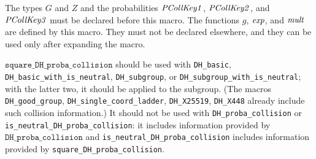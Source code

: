 \documentclass{article}
\begin{document}
\begin{itemize}
\begin{itemize}
\begin{itemize}
       The types $G$ and $Z$ and the probabilities $\mathit{PCollKey1}$, $\mathit{PCollKey2}$, 
       and $\mathit{PCollKey3}$ must be declared before this macro.  The
       functions $g$, $\mathit{exp}$, and $\mathit{mult}$ are defined by this
       macro. They must not be declared elsewhere, and they can be
       used only after expanding the macro.

       $\texttt{square\_DH\_proba\_collision}$ should be used with 
       \texttt{DH\_basic}, \texttt{DH\_basic\_with\_is\_neutral},
       \texttt{DH\_subgroup}, or \texttt{DH\_subgroup\_with\_is\_neutral};
       with the latter two,
       it should be applied to the subgroup. (The macros
       \texttt{DH\_good\_group}, \texttt{DH\_single\_coord\_ladder},
       \texttt{DH\_X25519}, \texttt{DH\_X448} already include such collision
       information.) It should not be used with \texttt{DH\_proba\_collision}
       or \texttt{is\_neutral\_DH\_proba\_collision}:
       it includes information provided by $\texttt{DH\_proba\_collision}$
       and \texttt{is\_neutral\_DH\_proba\_collision} includes information
       provided by \texttt{square\_DH\_proba\_collision}.


\end{itemize}
\end{itemize}
\end{itemize}
\end{document}
